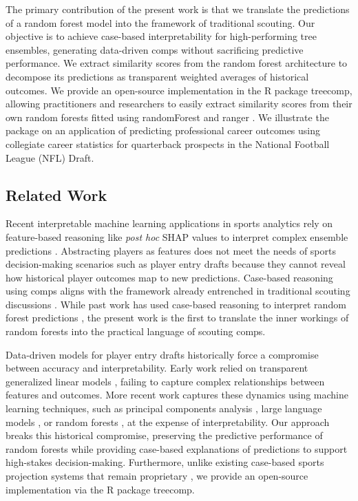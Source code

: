 \documentclass[Review, sageh, times, doublespace]{sagej}
\begin{document}
  The primary contribution of the present work is that we translate the predictions of a random forest model into the framework of traditional scouting. Our objective is to achieve case-based interpretability for high-performing tree ensembles, generating data-driven comps without sacrificing predictive performance. We extract similarity scores from the random forest architecture to decompose its predictions as transparent weighted averages of historical outcomes. We provide an open-source implementation in the R package treecomp, allowing practitioners and researchers to easily extract similarity scores from their own random forests fitted using randomForest \citep{breiman_randomforest_2024} and ranger \citep{wright_ranger_2017}. We illustrate the package on an application of predicting professional career outcomes using collegiate career statistics for quarterback prospects in the National Football League (NFL) Draft.

\subsection{Related Work}

  Recent interpretable machine learning applications in sports analytics rely on feature-based reasoning like \textit{post hoc} SHAP values \citep{lundberg_unified_2017} to interpret complex ensemble predictions \citep{janssens_predicting_2023, ouyang_integration_2024}. Abstracting players as features does not meet the needs of sports decision-making scenarios such as player entry drafts because they cannot reveal how historical player outcomes map to new predictions. Case-based reasoning using comps aligns with the framework already entrenched in traditional scouting discussions \citep{jones_nfl_2025,sikkema_2025_2025,trapasso_nfl_2025}. While past work has used case-based reasoning to interpret random forest predictions \citep{plumb_model_2018,mazumdar_random_2021}, the present work is the first to translate the inner workings of random forests into the practical language of scouting comps.
  
  Data-driven models for player entry drafts historically force a compromise between accuracy and interpretability. Early work relied on transparent generalized linear models \citep{robbins_national_2010, wolfson_quarterback_2011, mulholland_predicting_2014, craig_predicting_2021}, failing to capture complex relationships between features and outcomes. More recent work captures these dynamics using machine learning techniques, such as principal components analysis \citep{berger_jumping_2021}, large language models \citep{luo_improving_2024}, or random forests \citep{enaganti_optimizing_2025}, at the expense of interpretability. Our approach breaks this historical compromise, preserving the predictive performance of random forests while providing case-based explanations of predictions to support high-stakes decision-making. Furthermore, unlike existing case-based sports projection systems that remain proprietary \citep{wyers_reintroducing_2012}, we provide an open-source implementation via the R package treecomp.
\end{document}
